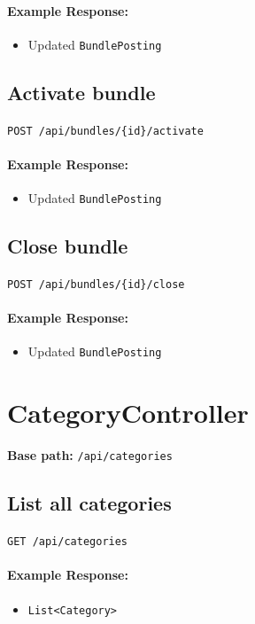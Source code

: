\documentclass[a4paper,11pt]{article}
\begin{document}
\paragraph{Example Response:}
\begin{itemize}
    \item Updated \texttt{BundlePosting}
\end{itemize}

\subsection{Activate bundle}
\texttt{POST /api/bundles/\{id\}/activate}

\paragraph{Example Response:}
\begin{itemize}
    \item Updated \texttt{BundlePosting}
\end{itemize}

\subsection{Close bundle}
\texttt{POST /api/bundles/\{id\}/close}

\paragraph{Example Response:}
\begin{itemize}
    \item Updated \texttt{BundlePosting}
\end{itemize}

\hrulefill

\section{CategoryController}
\textbf{Base path:} \texttt{/api/categories}

\subsection{List all categories}
\texttt{GET /api/categories}

\paragraph{Example Response:}
\begin{itemize}
    \item \texttt{List<Category>}
\end{itemize}
\end{document}
